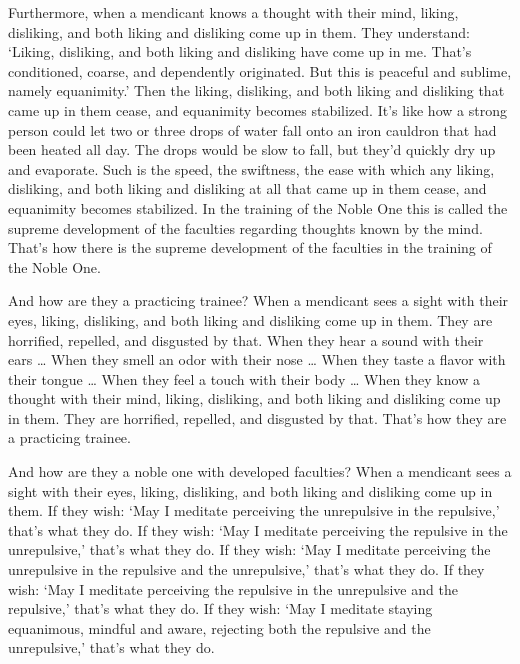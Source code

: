 \documentclass[12pt,openany]{book}%
\begin{document}
Furthermore, when a mendicant knows a thought with their mind, liking, disliking, and both liking and disliking come up in them. They understand: ‘Liking, disliking, and both liking and disliking have come up in me. That’s conditioned, coarse, and dependently originated. But this is peaceful and sublime, namely equanimity.’ Then the liking, disliking, and both liking and disliking that came up in them cease, and equanimity becomes stabilized. It’s like how a strong person could let two or three drops of water fall onto an iron cauldron that had been heated all day. The drops would be slow to fall, but they’d quickly dry up and evaporate. Such is the speed, the swiftness, the ease with which any liking, disliking, and both liking and disliking at all that came up in them cease, and equanimity becomes stabilized. In the training of the Noble One this is called the supreme development of the faculties regarding thoughts known by the mind. That’s how there is the supreme development of the faculties in the training of the Noble One. 

And how are they a practicing trainee? When a mendicant sees a sight with their eyes, liking, disliking, and both liking and disliking come up in them. They are horrified, repelled, and disgusted by that. When they hear a sound with their ears … When they smell an odor with their nose … When they taste a flavor with their tongue … When they feel a touch with their body … When they know a thought with their mind, liking, disliking, and both liking and disliking come up in them. They are horrified, repelled, and disgusted by that. That’s how they are a practicing trainee. 

And how are they a noble one with developed faculties? When a mendicant sees a sight with their eyes, liking, disliking, and both liking and disliking come up in them. If they wish: ‘May I meditate perceiving the unrepulsive in the repulsive,’ that’s what they do. If they wish: ‘May I meditate perceiving the repulsive in the unrepulsive,’ that’s what they do. If they wish: ‘May I meditate perceiving the unrepulsive in the repulsive and the unrepulsive,’ that’s what they do. If they wish: ‘May I meditate perceiving the repulsive in the unrepulsive and the repulsive,’ that’s what they do. If they wish: ‘May I meditate staying equanimous, mindful and aware, rejecting both the repulsive and the unrepulsive,’ that’s what they do. 
\end{document}
